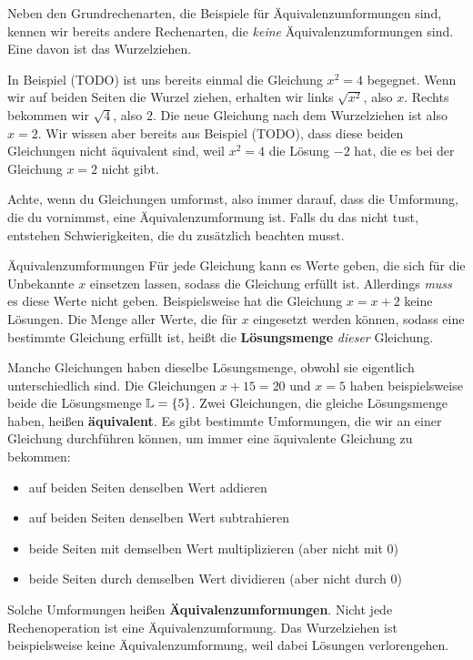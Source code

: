 \documentclass[../../main.tex]{subfiles}
\begin{document}
Neben den Grundrechenarten, die Beispiele für Äquivalenzumformungen sind, kennen wir bereits andere Rechenarten, die \emph{keine} Äquivalenzumformungen sind. Eine davon ist das Wurzelziehen.

\begin{example}
    In Beispiel (TODO) ist uns bereits einmal die Gleichung $x^2=4$ begegnet. Wenn wir auf beiden Seiten die Wurzel ziehen, erhalten wir links $\sqrt{x^2}$, also $x$. Rechts bekommen wir $\sqrt{4}$, also $2$. Die neue Gleichung nach dem Wurzelziehen ist also $x=2$. Wir wissen aber bereits aus Beispiel (TODO), dass diese beiden Gleichungen nicht äquivalent sind, weil $x^2=4$ die Lösung $-2$ hat, die es bei der Gleichung $x=2$ nicht gibt.
\end{example}

Achte, wenn du Gleichungen umformst, also immer darauf, dass die Umformung, die du vornimmst, eine Äquivalenzumformung ist. Falls du das nicht tust, entstehen Schwierigkeiten, die du zusätzlich beachten musst.

\begin{nutshell}{Äquivalenzumformungen}
    Für jede Gleichung kann es Werte geben, die sich für die Unbekannte $x$ einsetzen lassen, sodass die Gleichung erfüllt ist. Allerdings \emph{muss} es diese Werte nicht geben. Beispielsweise hat die Gleichung $x=x+2$ keine Lösungen. Die Menge aller Werte, die für $x$ eingesetzt werden können, sodass eine bestimmte Gleichung erfüllt ist, heißt die \textbf{Lösungsmenge} \Solutions \emph{dieser} Gleichung.
    
    Manche Gleichungen haben dieselbe Lösungsmenge, obwohl sie eigentlich unterschiedlich sind. Die Gleichungen $x+15=20$ und $x=5$ haben beispielsweise beide die Lösungsmenge $\mathbb{L}=\{5\}$. Zwei Gleichungen, die gleiche Lösungsmenge haben, heißen \textbf{äquivalent}. Es gibt bestimmte Umformungen, die wir an einer Gleichung durchführen können, um immer eine äquivalente Gleichung zu bekommen:
    \begin{itemize}
        \item auf beiden Seiten denselben Wert addieren
        \item auf beiden Seiten denselben Wert subtrahieren
        \item beide Seiten mit demselben Wert multiplizieren (aber nicht mit 0)
        \item beide Seiten durch demselben Wert dividieren (aber nicht durch 0)
    \end{itemize}
    Solche Umformungen heißen \textbf{Äquivalenzumformungen}. Nicht jede Rechenoperation ist eine Äquivalenzumformung. Das Wurzelziehen ist beispielsweise keine Äquivalenzumformung, weil dabei Lösungen verlorengehen.
\end{nutshell}
\end{document}
